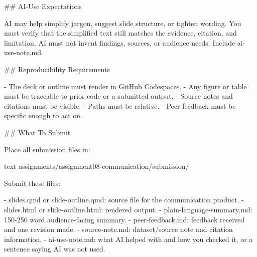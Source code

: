 \documentclass[
  letterpaper,
  DIV=11,
  numbers=noendperiod,
  oneside]{scrreprt}
\newenvironment{Shaded}{\begin{snugshade}}{\end{snugshade}}
\newcommand{\FunctionTok}[1]{\textcolor[rgb]{0.28,0.35,0.67}{#1}}
\newcommand{\InformationTok}[1]{\textcolor[rgb]{0.37,0.37,0.37}{#1}}
\newcommand{\NormalTok}[1]{\textcolor[rgb]{0.00,0.23,0.31}{#1}}
\newcommand{\SpecialStringTok}[1]{\textcolor[rgb]{0.13,0.47,0.30}{#1}}
\begin{document}
\begin{Shaded}
\begin{Highlighting}[numbers=left,,]
\FunctionTok{\#\# AI{-}Use Expectations}

\NormalTok{AI may help simplify jargon, suggest slide structure, or tighten wording. You must verify that the simplified text still matches the evidence, citation, and limitation. AI must not invent findings, sources, or audience needs. Include }\InformationTok{\textasciigrave{}ai{-}use{-}note.md\textasciigrave{}}\NormalTok{.}

\FunctionTok{\#\# Reproducibility Requirements}

\SpecialStringTok{{-} }\NormalTok{The deck or outline must render in GitHub Codespaces.}
\SpecialStringTok{{-} }\NormalTok{Any figure or table must be traceable to prior code or a submitted output.}
\SpecialStringTok{{-} }\NormalTok{Source notes and citations must be visible.}
\SpecialStringTok{{-} }\NormalTok{Paths must be relative.}
\SpecialStringTok{{-} }\NormalTok{Peer feedback must be specific enough to act on.}

\FunctionTok{\#\# What To Submit}

\NormalTok{Place all submission files in:}

\InformationTok{\textasciigrave{}\textasciigrave{}\textasciigrave{}text}
\InformationTok{assignments/assignment08{-}communication/submission/}
\InformationTok{\textasciigrave{}\textasciigrave{}\textasciigrave{}}

\NormalTok{Submit these files:}

\SpecialStringTok{{-} }\InformationTok{\textasciigrave{}slides.qmd\textasciigrave{}}\NormalTok{ or }\InformationTok{\textasciigrave{}slide{-}outline.qmd\textasciigrave{}}\NormalTok{: source file for the communication product.}
\SpecialStringTok{{-} }\InformationTok{\textasciigrave{}slides.html\textasciigrave{}}\NormalTok{ or }\InformationTok{\textasciigrave{}slide{-}outline.html\textasciigrave{}}\NormalTok{: rendered output.}
\SpecialStringTok{{-} }\InformationTok{\textasciigrave{}plain{-}language{-}summary.md\textasciigrave{}}\NormalTok{: 150{-}250 word audience{-}facing summary.}
\SpecialStringTok{{-} }\InformationTok{\textasciigrave{}peer{-}feedback.md\textasciigrave{}}\NormalTok{: feedback received and one revision made.}
\SpecialStringTok{{-} }\InformationTok{\textasciigrave{}source{-}note.md\textasciigrave{}}\NormalTok{: dataset/source note and citation information.}
\SpecialStringTok{{-} }\InformationTok{\textasciigrave{}ai{-}use{-}note.md\textasciigrave{}}\NormalTok{: what AI helped with and how you checked it, or a sentence saying AI was not used.}


\end{Highlighting}
\end{Shaded}
\end{document}

